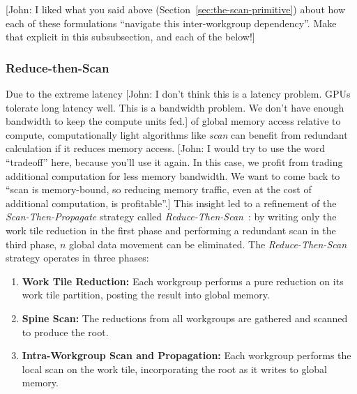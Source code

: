 \documentclass[sigconf]{acmart}
\newcommand{\john}[1]{{\footnotesize\color{cyan}[John: #1]}}
\begin{document}
\john{I liked what you said above (Section~\ref{sec:the-scan-primitive}) about how each of these formulations ``navigate this inter-workgroup dependency''. Make that explicit in this subsubsection, and each of the below!}

\subsubsection{Reduce-then-Scan}
Due to the extreme latency \john{I don't think this is a latency problem. GPUs tolerate long latency well. This is a bandwidth problem. We don't have enough bandwidth to keep the compute units fed.} of global memory access relative to compute, computationally light algorithms like \emph{scan} can benefit from redundant calculation if it reduces memory access. \john{I would try to use the word ``tradeoff'' here, because you'll use it again. In this case, we profit from trading additional computation for less memory bandwidth. We want to come back to ``scan is memory-bound, so reducing memory traffic, even at the cost of additional computation, is profitable''.} This insight led to a refinement of the \emph{Scan-Then-Propagate} strategy called \emph{Reduce-Then-Scan}~\cite{Merrill-Grimshaw, Ha-and-Han, Dotsenko, Breitbart}: by writing only the work tile reduction in the first phase and performing a redundant scan in the third phase, $n$ global data movement can be eliminated. The \emph{Reduce-Then-Scan} strategy operates in three phases:
\begin{enumerate}
  \item \textbf{Work Tile Reduction:} Each workgroup performs a pure reduction on its work tile partition, posting the result into global memory.
  \item \textbf{Spine Scan:} The reductions from all workgroups are gathered and scanned to produce the root.
  \item \textbf{Intra-Workgroup Scan and Propagation:} Each workgroup performs the local scan on the work tile, incorporating the root as it writes to global memory.
\end{enumerate}
\end{document}
